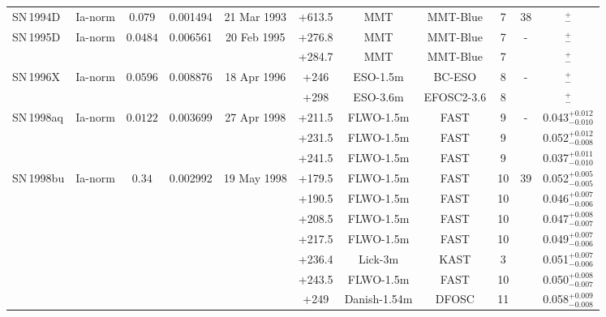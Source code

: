 \documentclass[fleqn,usenatbib]{mnras}
\begin{document}
\begin{table}
{\begin{tabular}{l c c cccccccc}
    SN\,1994D  & Ia-norm   & $0.079$  & 0.001494 & 21 Mar 1993  & +613.5 & MMT & MMT-Blue             & 7 & 38 & $^{+}_{-}$ \\
    SN\,1995D  & Ia-norm   & $0.0484$ & 0.006561 & 20 Feb 1995  & +276.8 & MMT & MMT-Blue             & 7 & - & $^{+}_{-}$  \\
             &           &          &          &              & +284.7 & MMT & MMT-Blue             & 7 & & $^{+}_{-}$ \\
    SN\,1996X  & Ia-norm   & $0.0596$ & 0.008876 & 18 Apr 1996  & +246   & ESO-1.5m & BC-ESO          & 8 & - & $^{+}_{-}$ \\
             &           &          &          &              & +298   & ESO-3.6m & EFOSC2-3.6      & 8 & & $^{+}_{-}$ \\
    SN\,1998aq & Ia-norm   & $0.0122$ & 0.003699 & 27 Apr 1998  & +211.5 & FLWO-1.5m & FAST           & 9 & - & 0.043$^{+0.012}_{-0.010}$ \\
             &           &          &          &              & +231.5 & FLWO-1.5m & FAST           & 9 & & 0.052$^{+0.012}_{-0.008}$ \\
             &           &          &          &              & +241.5 & FLWO-1.5m & FAST           & 9 & & 0.037$^{+0.011}_{-0.010}$ \\
    SN\,1998bu & Ia-norm   & $0.34$   & 0.002992 & 19 May 1998  & +179.5 & FLWO-1.5m & FAST           & 10&39&0.052$^{+0.005}_{-0.005}$ \\
             &           &          &          &              & +190.5 & FLWO-1.5m & FAST           & 10& & 0.046$^{+0.007}_{-0.006}$ \\
             &           &          &          &              & +208.5 & FLWO-1.5m & FAST           & 10& & 0.047$^{+0.008}_{-0.007}$ \\
             &           &          &          &              & +217.5 & FLWO-1.5m & FAST           & 10& & 0.049$^{+0.007}_{-0.006}$ \\
             &           &          &          &              & +236.4 & Lick-3m & KAST             & 3 & & 0.051$^{+0.007}_{-0.006}$ \\
             &           &          &          &              & +243.5 & FLWO-1.5m & FAST           & 10& & 0.050$^{+0.008}_{-0.007}$ \\
             &           &          &          &              & +249   & Danish-1.54m & DFOSC       & 11& & 0.058$^{+0.009}_{-0.008}$ \\

\end{tabular}}
\end{table}
\end{document}
